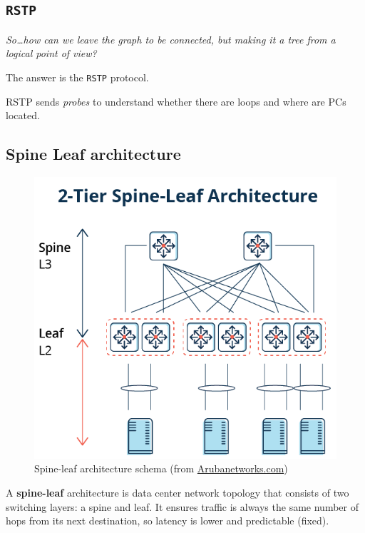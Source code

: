 \subsection{\texttt{RSTP}}
\begin{center}
   \textit{So\dots how can we leave the graph to be connected, but making it a tree from a logical point of view?}

   The answer is the \texttt{RSTP} protocol.
\end{center}

RSTP sends \textit{probes} to understand whether there are loops and where are PCs located.

\subsection{Spine Leaf architecture}
\begin{figure}[htbp]
   \centering
   \includegraphics{images/spineleaf.png}
   \caption{Spine-leaf architecture schema (from \href{https://www.arubanetworks.com/faq/what-is-spine-leaf-architecture/}{Arubanetworks.com})}
   \label{fig:}
\end{figure}
A \textbf{spine-leaf} architecture is data center network topology that consists of two switching layers: a spine and leaf.
It ensures traffic is always the same number of hops from its next destination, so latency is lower and predictable (fixed).

